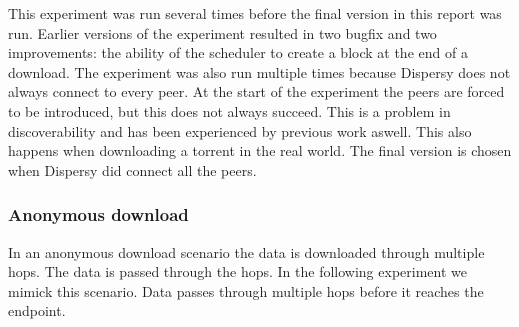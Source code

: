 This experiment was run several times before the final version in this report was run.
Earlier versions of the experiment resulted in two bugfix and two improvements:
the ability of the scheduler to create a block at the end of a download.
The experiment was also run multiple times because Dispersy does not always connect to every peer.
At the start of the experiment the peers are forced to be introduced,
but this does not always succeed.
This is a problem in discoverability and has been experienced by previous work aswell\cite{ruigrok-anonymous}.
This also happens when downloading a torrent in the real world.
The final version is chosen when Dispersy did connect all the peers.

\subsubsection{Anonymous download}
In an anonymous download scenario the data is downloaded through multiple hops.
The data is passed through the hops.
In the following experiment we mimick this scenario.
Data passes through multiple hops before it reaches the endpoint.



